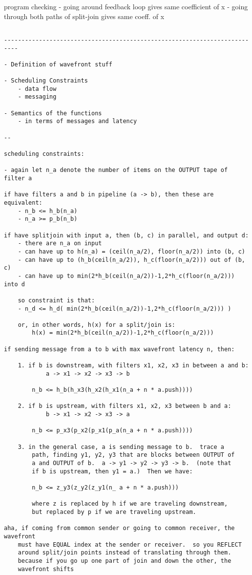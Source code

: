 program checking 
	- going around feedback loop gives same coefficient of x
	- going through both paths of split-join gives same coeff. of x

\begin{verbatim}

--------------------------------------------------------------------------

- Definition of wavefront stuff

- Scheduling Constraints
	- data flow
	- messaging

- Semantics of the functions
	- in terms of messages and latency

--

scheduling constraints:

- again let n_a denote the number of items on the OUTPUT tape of filter a

if have filters a and b in pipeline (a -> b), then these are equivalent:
	- n_b <= h_b(n_a)
	- n_a >= p_b(n_b)

if have splitjoin with input a, then (b, c) in parallel, and output d:
	- there are n_a on input
	- can have up to h(n_a) = (ceil(n_a/2), floor(n_a/2)) into (b, c)
	- can have up to (h_b(ceil(n_a/2)), h_c(floor(n_a/2))) out of (b, c)
	- can have up to min(2*h_b(ceil(n_a/2))-1,2*h_c(floor(n_a/2))) into d

	so constraint is that:
	- n_d <= h_d( min(2*h_b(ceil(n_a/2))-1,2*h_c(floor(n_a/2))) )

	or, in other words, h(x) for a split/join is:
		h(x) = min(2*h_b(ceil(n_a/2))-1,2*h_c(floor(n_a/2)))

if sending message from a to b with max wavefront latency n, then:
	
	1. if b is downstream, with filters x1, x2, x3 in between a and b:
			a -> x1 -> x2 -> x3 -> b

		n_b <= h_b(h_x3(h_x2(h_x1(n_a + n * a.push))))

	2. if b is upstream, with filters x1, x2, x3 between b and a:
			b -> x1 -> x2 -> x3 -> a

		n_b <= p_x3(p_x2(p_x1(p_a(n_a + n * a.push))))

	3. in the general case, a is sending message to b.  trace a
		path, finding y1, y2, y3 that are blocks between OUTPUT of
		a and OUTPUT of b.  a -> y1 -> y2 -> y3 -> b.  (note that
		if b is upstream, then y1 = a.)  Then we have:

		n_b <= z_y3(z_y2(z_y1(n_ a + n * a.push)))

		where z is replaced by h if we are traveling downstream, 
		but replaced by p if we are traveling upstream.

aha, if coming from common sender or going to common receiver, the wavefront
	must have EQUAL index at the sender or receiver.  so you REFLECT
	around split/join points instead of translating through them.
	because if you go up one part of join and down the other, the
	wavefront shifts

\end{verbatim}


